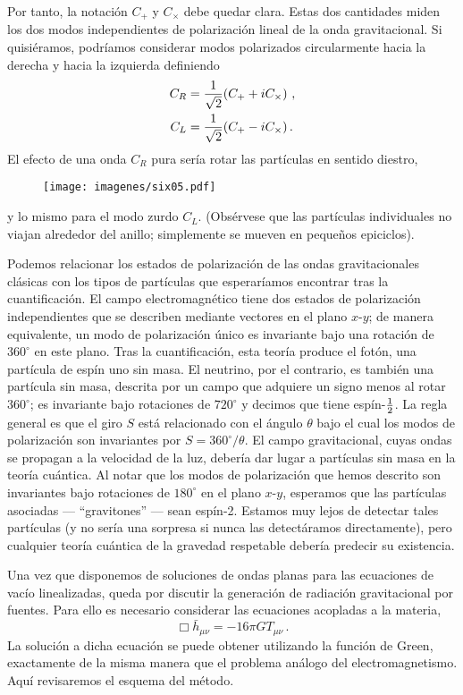 \documentclass[11pt,b5paper,openany,twoside]{book}
\newcommand{\mn}{{\mu\nu}}
\def\bh{{\bar h}}
\begin{document}
\noindent
Por tanto, la notación $C_+$ y $C_\times$ debe quedar clara.
Estas dos cantidades miden los dos modos independientes de polarización lineal de la onda gravitacional.
Si quisiéramos, podríamos considerar modos polarizados circularmente hacia la derecha y hacia la izquierda definiendo
\begin{align}
C_R  &=  {1\over {\sqrt2}}(C_+ +i C_\times)\ , \notag \\
C_L  &=  {1\over {\sqrt2}}(C_+ -i C_\times)\,. \label{6.69}
\end{align}
El efecto de una onda $C_R$ pura sería rotar las partículas en sentido diestro,

\begin{figure}[h]
\centering
\texttt{[image: imagenes/six05.pdf]}
\end{figure}

\noindent
y lo mismo para el modo zurdo $C_L$.
(Obsérvese que las partículas individuales no viajan alrededor del anillo; simplemente se mueven en pequeños epiciclos).

Podemos relacionar los estados de polarización de las ondas gravitacionales clásicas con los tipos de partículas que esperaríamos encontrar tras la cuantificación.
El campo electromagnético tiene dos estados de polarización independientes que se describen mediante vectores en el plano $x$-$y$; de manera equivalente, un modo de polarización único es invariante bajo una rotación de $360^\circ$ en este plano.
Tras la cuantificación, esta teoría produce el fotón, una partícula de espín uno sin masa.
El neutrino, por el contrario, es también una partícula sin masa, descrita por un campo que adquiere un signo menos al rotar $360^\circ$; es invariante bajo rotaciones de $720^\circ$ y decimos que tiene espín-${1\over 2}$.
La regla general es que el giro $S$ está relacionado con el ángulo $\theta$ bajo el cual los modos de polarización son invariantes por $S=360^\circ/\theta$.
El campo gravitacional, cuyas ondas se propagan a la velocidad de la luz, debería dar lugar a partículas sin masa en la teoría cuántica.
Al notar que los modos de polarización que hemos descrito son invariantes bajo rotaciones de $180^\circ$ en el plano $x$-$y$, esperamos que las partículas asociadas --- ``gravitones'' --- sean espín-2.
Estamos muy lejos de detectar tales partículas (y no sería una sorpresa si nunca las detectáramos directamente), pero cualquier teoría cuántica de la gravedad respetable debería predecir su existencia.

Una vez que disponemos de soluciones de ondas planas para las ecuaciones de vacío linealizadas, queda por discutir la generación de radiación gravitacional por fuentes.
Para ello es necesario considerar las ecuaciones acopladas a la materia,
\begin{equation}
\Box \bh_\mn = -16\pi G T_\mn\,.\label{6.70}
\end{equation}
La solución a dicha ecuación se puede obtener utilizando la función de Green, exactamente de la misma manera que el problema análogo del electromagnetismo.
Aquí revisaremos el esquema del método.
\end{document}
